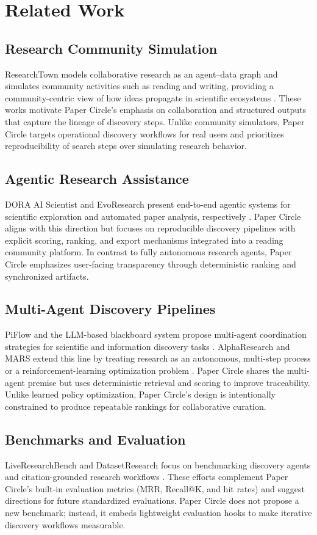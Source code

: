 \section{Related Work}

\subsection{Research Community Simulation}
ResearchTown models collaborative research as an agent--data graph and simulates community activities such as reading and writing, providing a community-centric view of how ideas propagate in scientific ecosystems \cite{yu2025_1,yu2025_3}. These works motivate Paper Circle's emphasis on collaboration and structured outputs that capture the lineage of discovery steps. Unlike community simulators, Paper Circle targets operational discovery workflows for real users and prioritizes reproducibility of search steps over simulating research behavior.

\subsection{Agentic Research Assistance}
DORA AI Scientist and EvoResearch present end-to-end agentic systems for scientific exploration and automated paper analysis, respectively \cite{naumov2025_51,gajjar2025_61}. Paper Circle aligns with this direction but focuses on reproducible discovery pipelines with explicit scoring, ranking, and export mechanisms integrated into a reading community platform. In contrast to fully autonomous research agents, Paper Circle emphasizes user-facing transparency through deterministic ranking and synchronized artifacts.

\subsection{Multi-Agent Discovery Pipelines}
PiFlow and the LLM-based blackboard system propose multi-agent coordination strategies for scientific and information discovery tasks \cite{unknown2026_6,unknown2026_5}. AlphaResearch and MARS extend this line by treating research as an autonomous, multi-step process or a reinforcement-learning optimization problem \cite{unknown2026_17,unknown2026_20}. Paper Circle shares the multi-agent premise but uses deterministic retrieval and scoring to improve traceability. Unlike learned policy optimization, Paper Circle's design is intentionally constrained to produce repeatable rankings for collaborative curation.

\subsection{Benchmarks and Evaluation}
LiveResearchBench and DatasetResearch focus on benchmarking discovery agents and citation-grounded research workflows \cite{unknown2026_24,unknown2026_11}. These efforts complement Paper Circle's built-in evaluation metrics (MRR, Recall@K, and hit rates) and suggest directions for future standardized evaluations. Paper Circle does not propose a new benchmark; instead, it embeds lightweight evaluation hooks to make iterative discovery workflows measurable.
